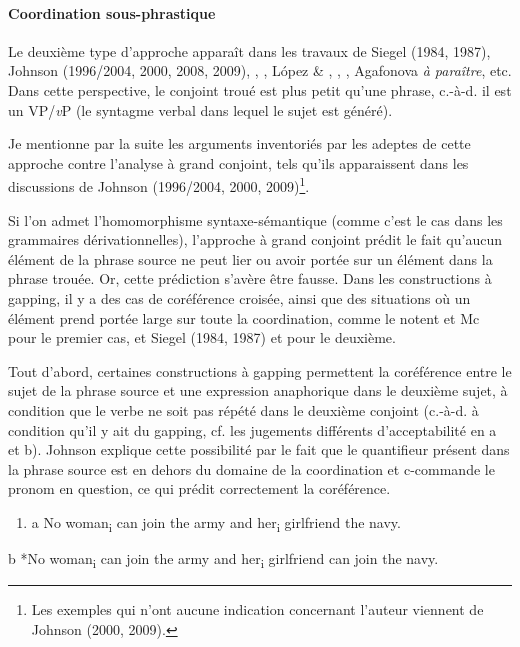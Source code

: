 \paragraph[Coordination sous-phrastique]{Coordination sous-phrastique}
\label{bkm:Ref288588249}Le deuxième type d'approche apparaît dans les travaux de Siegel (1984, 1987), Johnson (1996/2004, 2000, 2008, 2009), \citet{Coppock2001}, \citet{Lin2002}, López \& \citet{Winkler2003}, \citet{Winkler2005}, \citet{Hulsey2008}, Agafonova \textit{à paraître}, etc. Dans cette perspective, le conjoint troué est plus petit qu'une phrase, c.-à-d. il est un VP/\textit{v}P (le syntagme verbal dans lequel le sujet est généré). 

Je mentionne par la suite les arguments inventoriés par les adeptes de cette approche contre l'analyse à grand conjoint, tels qu'ils apparaissent dans les discussions de Johnson (1996/2004, 2000, 2009)\footnote{Les exemples qui n'ont aucune indication concernant l'auteur viennent de Johnson (2000, 2009).}. 

Si l'on admet l'homomorphisme syntaxe-sémantique (comme c'est le cas dans les grammaires dérivationnelles), l'approche à grand conjoint prédit le fait qu'aucun élément de la phrase source ne peut lier ou avoir portée sur un élément dans la phrase trouée. Or, cette prédiction s'avère être fausse. Dans les constructions à gapping, il y a des cas de coréférence croisée, ainsi que des situations où un élément prend portée large sur toute la coordination, comme le notent \citet{Oehrle1987} et Mc\citet{Cawley1993} pour le premier cas, et Siegel (1984, 1987) et \citet{Oehrle1987} pour le deuxième. 

Tout d'abord, certaines constructions à gapping permettent la coréférence entre le sujet de la phrase source et une expression anaphorique dans le deuxième sujet, à condition que le verbe ne soit pas répété dans le deuxième conjoint (c.-à-d. à condition qu'il y ait du gapping, cf. les jugements différents d'acceptabilité en a et b). Johnson explique cette possibilité par le fait que le quantifieur présent dans la phrase source est en dehors du domaine de la coordination et c-commande le pronom en question, ce qui prédit correctement la coréférence. 


\begin{enumerate}
\item \label{bkm:Ref289807670}a   No woman\textsubscript{i} can join the army and her\textsubscript{i} girlfriend the navy.  


\end{enumerate}
  b  *No woman\textsubscript{i} can join the army and her\textsubscript{i} girlfriend can join the navy. 

